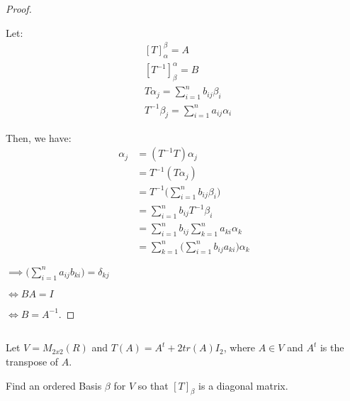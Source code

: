 \documentclass{article}
\newenvironment{customthm}[1]
  {\renewcommand\theinnercustomthm{#1}\innercustomthm}
  {\endinnercustomthm}
\begin{document}
\begin{proof}
  $ $

  Let: 
  \begin{align*}
    &[T]_\alpha^\beta = A \\
    &[T^{-1}]_\beta^\alpha = B \\
    &T \alpha_j = \sum\limits_{i = 1}^{n} b_{ij} \beta_i \\
    &T^{-1} \beta_j = \sum\limits_{i = 1}^{n} a_{ij} \alpha_i
  \end{align*}

  Then, we have:
  \begin{align*}
    \alpha_j 
    &= (T^{-1} T) \alpha_j \\
    &= T^{-1} (T \alpha_j) \\
    &= T^{-1} \bigg( \sum\limits_{i = 1}^{n} b_{ij} \beta_i \bigg) \\
    &= \sum\limits_{i = 1}^{n} b_{ij} T^{-1} \beta_i \\
    &= \sum\limits_{i = 1}^{n} b_{ij} \sum\limits_{k = 1}^{n} a_{ki} \alpha_k \\
    &= \sum\limits_{k = 1}^{n} \bigg( \sum\limits_{i = 1}^{n} b_{ij} a_{ki} \bigg) \alpha_k
  \end{align*}

  \noindent
  $\implies \bigg( \sum\limits_{i = 1}^{n} a_{ij} b_{ki} \bigg) = \delta_{kj}$

  \noindent
  $\iff BA = I$

  \noindent
  $\iff B = A^{-1}$.

\end{proof}
\newpage

\begin{customthm}{9}[2023.S(2.C)]
  $ $

  Let $V = M_{2x2}(R)$ and $T(A) = A^t + 2tr(A)I_2$, where $A \in V$ and $A^t$ is the transpose of $A$.

  Find an ordered Basis $\beta$ for $V$ so that $[T]_\beta$ is a diagonal matrix.
\end{customthm}
\end{document}
